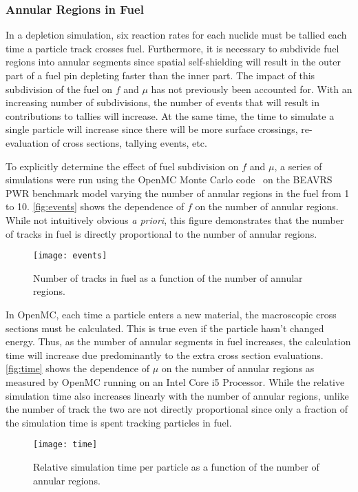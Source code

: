 \documentclass{snamc2013}
\begin{document}
\subsubsection{Annular Regions in Fuel}

In a depletion simulation, six reaction rates for each nuclide must be tallied
each time a particle track crosses fuel. Furthermore, it is necessary to
subdivide fuel regions into annular segments since spatial self-shielding will
result in the outer part of a fuel pin depleting faster than the inner part. The
impact of this subdivision of the fuel on $f$ and $\mu$ has not previously been
accounted for. With an increasing number of subdivisions, the number of events
that will result in contributions to tallies will increase. At the same time,
the time to simulate a single particle will increase since there will be more
surface crossings, re-evaluation of cross sections, tallying events, etc.

To explicitly determine the effect of fuel subdivision on $f$ and $\mu$, a
series of simulations were run using the OpenMC Monte Carlo
code~\cite{ane-romano-2013} on the BEAVRS PWR benchmark model varying the number
of annular regions in the fuel from 1 to 10.  \autoref{fig:events} shows the
dependence of $f$ on the number of annular regions. While not intuitively
obvious \emph{a priori}, this figure demonstrates that the number of tracks in
fuel is directly proportional to the number of annular regions.
\begin{figure}[htb]
  \centering
  \texttt{[image: events]}
  \caption{Number of tracks in fuel as a function of the number of annular
    regions.}
  \label{fig:events}
\end{figure}

In OpenMC, each time a particle enters a new material, the macroscopic cross
sections must be calculated. This is true even if the particle hasn't changed
energy. Thus, as the number of annular segments in fuel increases, the
calculation time will increase due predominantly to the extra cross section
evaluations. \autoref{fig:time} shows the dependence of $\mu$ on the number of
annular regions as measured by OpenMC running on an Intel Core i5
Processor. While the relative simulation time also increases linearly with the
number of annular regions, unlike the number of track the two are not directly
proportional since only a fraction of the simulation time is spent tracking
particles in fuel.
\begin{figure}[b]
  \centering
  \texttt{[image: time]}
  \caption{Relative simulation time per particle as a function of the number of
    annular regions.}
  \label{fig:time}
\end{figure}
\end{document}
